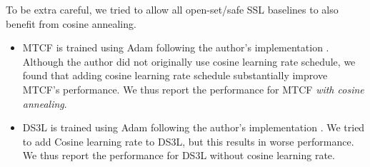 To be extra careful, we tried to allow all open-set/safe SSL baselines to also benefit from cosine annealing.
\begin{itemize}
\item MTCF is trained using Adam following the author's implementation \citep{yuMultiTaskCurriculumFramework2020}.
Although the author did not originally use cosine learning rate schedule, we found that adding cosine learning rate schedule substantially improve MTCF's performance.
We thus report the performance for MTCF \emph{with cosine annealing}. 

\item DS3L is trained using Adam following the author's implementation \citep{guoSafeDeepSemiSupervised2020}.
We tried to add Cosine learning rate to DS3L, but this results in worse performance.
We thus report the performance for DS3L without cosine learning rate.

\end{itemize}







